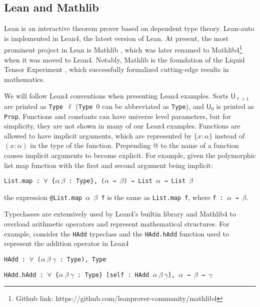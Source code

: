 \subsection{Lean and Mathlib}\label{sectlean}

  Lean is an interactive theorem prover based on dependent type theory. Lean-auto
  is implemented in Lean4, the latest version of Lean. At present, the
  most prominent project in Lean is Mathlib \cite{MathlibPaper},
  which was later renamed to Mathlib4\footnote{Github link: https://github.com/leanprover-community/mathlib4}
  when it was moved to Lean4. Notably, Mathlib is the foundation of the
  Liquid Tensor Experiment \cite{LiquidTensor}, which successfully
  formalized cutting-edge results in mathematics. 

  We will follow Lean4 conventions when presenting Lean4 examples. Sorts $\mathsf{U}_{\ell + 1}$
  are printed as \texttt{Type $\ell$} (\texttt{Type $0$} can be abbreviated as \texttt{Type}), and $\mathsf{U}_0$ is printed as \texttt{Prop}.
  Functions and constants can have universe level parameters, but for simplicity,
  they are not shown in many of our Lean4 examples. 
  Functions are allowed to have implicit arguments, which are represented by
  $\{x : \alpha\}$ instead of $(x : \alpha)$ in the type of the function.
  Prepending \textrm{@} to the name of a function causes implicit arguments
  to become explicit. For example, given the polymorphic list map function
  with the first and second argument being implicit:

  \centerline{\texttt{List.map : $\forall$ \{$\alpha \ \beta$ : Type\}, ($\alpha$ → $\beta$) → List $\alpha$ → List $\beta$}}
  
  \noindent the expression \texttt{@List.map $\alpha$ $\beta$ f} is the same as \texttt{List.map f}, where \texttt{f : $\alpha$ → $\beta$}.

  Typeclasses are extensively used by Lean4's builtin library and Mathlib4 to
  overload arithmetic operators and represent mathematical structures. For example,
  consider the \texttt{HAdd} typeclass and the \texttt{HAdd.hAdd} function
  used to represent the addition operator in Lean4
  
  \centerline{\texttt{HAdd : $\forall$ ($\alpha \ \beta \ \gamma$ : Type), Type}}
  \centerline{\texttt{HAdd.hAdd : $\forall$ \{$\alpha \ \beta \ \gamma$ : Type\} [self : HAdd $\alpha \ \beta \ \gamma$], $\alpha$ → $\beta$ → $\gamma$}}

